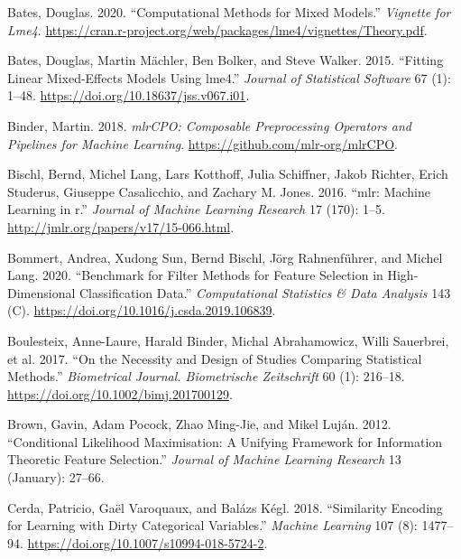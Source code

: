 \documentclass[smallextended]{svjour3}       %
\newlength{\cslhangindent}
\newlength{\cslentryspacingunit} %
\newenvironment{CSLReferences}[2] %
 {%
  \setlength{\parindent}{0pt}
  \ifodd #1
  \let\oldpar\par
  \def\par{\hangindent=\cslhangindent\oldpar}
  \fi
  \setlength{\parskip}{#2\cslentryspacingunit}
 }%
 {}
\begin{document}
\hypertarget{refs}{}
\begin{CSLReferences}{1}{0}
\leavevmode{}%
Bates, Douglas. 2020. {``Computational Methods for Mixed Models.''} \emph{Vignette for Lme4}. \url{https://cran.r-project.org/web/packages/lme4/vignettes/Theory.pdf}.

\leavevmode{}%
Bates, Douglas, Martin Mächler, Ben Bolker, and Steve Walker. 2015. {``Fitting Linear Mixed-Effects Models Using {lme4}.''} \emph{Journal of Statistical Software} 67 (1): 1--48. \url{https://doi.org/10.18637/jss.v067.i01}.

\leavevmode{}%
Binder, Martin. 2018. \emph{mlrCPO: Composable Preprocessing Operators and Pipelines for Machine Learning}. \url{https://github.com/mlr-org/mlrCPO}.

\leavevmode{}%
Bischl, Bernd, Michel Lang, Lars Kotthoff, Julia Schiffner, Jakob Richter, Erich Studerus, Giuseppe Casalicchio, and Zachary M. Jones. 2016. {``{mlr}: Machine Learning in r.''} \emph{Journal of Machine Learning Research} 17 (170): 1--5. \url{http://jmlr.org/papers/v17/15-066.html}.

\leavevmode{}%
Bommert, Andrea, Xudong Sun, Bernd Bischl, Jörg Rahnenführer, and Michel Lang. 2020. {``Benchmark for Filter Methods for Feature Selection in High-Dimensional Classification Data.''} \emph{Computational Statistics \& Data Analysis} 143 (C). \url{https://doi.org/10.1016/j.csda.2019.106839}.

\leavevmode{}%
Boulesteix, Anne-Laure, Harald Binder, Michal Abrahamowicz, Willi Sauerbrei, et al. 2017. {``On the Necessity and Design of Studies Comparing Statistical Methods.''} \emph{Biometrical Journal. Biometrische Zeitschrift} 60 (1): 216--18. \url{https://doi.org/10.1002/bimj.201700129}.

\leavevmode{}%
Brown, Gavin, Adam Pocock, Zhao Ming-Jie, and Mikel Luján. 2012. {``Conditional Likelihood Maximisation: A Unifying Framework for Information Theoretic Feature Selection.''} \emph{Journal of Machine Learning Research} 13 (January): 27--66.

\leavevmode{}%
Cerda, Patricio, Gaël Varoquaux, and Balázs Kégl. 2018. {``Similarity Encoding for Learning with Dirty Categorical Variables.''} \emph{Machine Learning} 107 (8): 1477--94. \url{https://doi.org/10.1007/s10994-018-5724-2}.


\end{CSLReferences}
\end{document}

